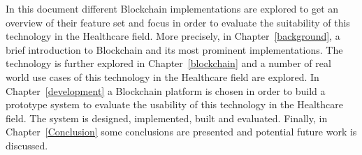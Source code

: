 In this document different Blockchain implementations are explored to get an
overview of their feature set and focus in order to evaluate the suitability of
this technology in the Healthcare field. More precisely, in
Chapter~\ref{background}, a brief introduction to Blockchain and its most
prominent implementations. The technology is further explored in
Chapter~\ref{blockchain} and a number of real world use cases of this
technology in the Healthcare field are explored.  In Chapter~\ref{development}
a Blockchain platform is chosen in order to build a prototype system to
evaluate the usability of this technology in the Healthcare field. The system
is designed, implemented, built and evaluated. Finally, in
Chapter~\ref{Conclusion} some conclusions are presented and potential future
work is discussed.
